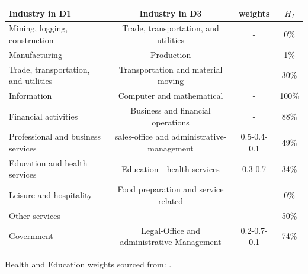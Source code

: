                 \begin{tabular}{|p{4.5cm}|c|c|c|} %
                      \toprule 
                       \textbf{Industry in D1} & \textbf{Industry in D3}  & \textbf{weights} & \textbf{$H_I$}\\
                      \midrule 
                       Mining, logging, construction& Trade, transportation, and utilities & - & 0\%\\
                       Manufacturing& Production & - & 1\%\\
                       Trade, transportation, and utilities& Transportation and material moving & - & 30\%\\
                       Information& Computer and mathematical & - & 100\%\\
                       Financial activities& Business and financial operations & - & 88\%\\
                       Professional and business services & sales-office and administrative-management & 0.5-0.4-0.1 & 49\%\\
                       Education and health services& Education - health services&0.3-0.7 & 34\%\\
                       Leisure and hospitality& Food preparation and service related&- & 0\%\\
                       Other services & - & - & 50\%\\
                       Government & Legal-Office and administrative-Management& 0.2-0.7-0.1 & 74\%\\
                       
                       
                       

                      \bottomrule 
                    \end{tabular}
                
                Health and Education weights sourced from: \cite{eduStats} \cite{eduStats2}.
                
                
                

